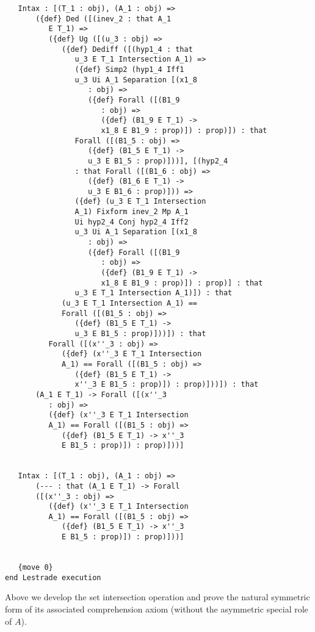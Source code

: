 \documentclass[12pt]{article}
\begin{document}
\begin{verbatim}
   Intax : [(T_1 : obj), (A_1 : obj) => 
       ({def} Ded ([(inev_2 : that A_1 
          E T_1) => 
          ({def} Ug ([(u_3 : obj) => 
             ({def} Dediff ([(hyp1_4 : that 
                u_3 E T_1 Intersection A_1) => 
                ({def} Simp2 (hyp1_4 Iff1 
                u_3 Ui A_1 Separation [(x1_8 
                   : obj) => 
                   ({def} Forall ([(B1_9 
                      : obj) => 
                      ({def} (B1_9 E T_1) -> 
                      x1_8 E B1_9 : prop)]) : prop)]) : that 
                Forall ([(B1_5 : obj) => 
                   ({def} (B1_5 E T_1) -> 
                   u_3 E B1_5 : prop)]))], [(hyp2_4 
                : that Forall ([(B1_6 : obj) => 
                   ({def} (B1_6 E T_1) -> 
                   u_3 E B1_6 : prop)])) => 
                ({def} (u_3 E T_1 Intersection 
                A_1) Fixform inev_2 Mp A_1 
                Ui hyp2_4 Conj hyp2_4 Iff2 
                u_3 Ui A_1 Separation [(x1_8 
                   : obj) => 
                   ({def} Forall ([(B1_9 
                      : obj) => 
                      ({def} (B1_9 E T_1) -> 
                      x1_8 E B1_9 : prop)]) : prop)] : that 
                u_3 E T_1 Intersection A_1)]) : that 
             (u_3 E T_1 Intersection A_1) == 
             Forall ([(B1_5 : obj) => 
                ({def} (B1_5 E T_1) -> 
                u_3 E B1_5 : prop)]))]) : that 
          Forall ([(x''_3 : obj) => 
             ({def} (x''_3 E T_1 Intersection 
             A_1) == Forall ([(B1_5 : obj) => 
                ({def} (B1_5 E T_1) -> 
                x''_3 E B1_5 : prop)]) : prop)]))]) : that 
       (A_1 E T_1) -> Forall ([(x''_3 
          : obj) => 
          ({def} (x''_3 E T_1 Intersection 
          A_1) == Forall ([(B1_5 : obj) => 
             ({def} (B1_5 E T_1) -> x''_3 
             E B1_5 : prop)]) : prop)]))]


   Intax : [(T_1 : obj), (A_1 : obj) => 
       (--- : that (A_1 E T_1) -> Forall 
       ([(x''_3 : obj) => 
          ({def} (x''_3 E T_1 Intersection 
          A_1) == Forall ([(B1_5 : obj) => 
             ({def} (B1_5 E T_1) -> x''_3 
             E B1_5 : prop)]) : prop)]))]


   {move 0}
end Lestrade execution
\end{verbatim}

Above we develop the set intersection operation and prove the natural symmetric form of its associated comprehension axiom (without the asymmetric special role of $A$).
\end{document}
